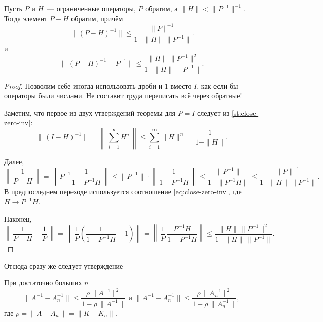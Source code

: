 \documentclass{trlnotes}
\begin{document}
    \begin{st} \label{st:close-inv}
        Пусть $P$ и $H$~--- ограниченные операторы, $P$ обратим, а $\|H\| < \|P^{-1}\|^{-1}$. Тогда элемент $P - H$ обратим, причём
        \[
            \big\| \, (P - H)^{-1}\big\|  \leqslant \dfrac{\|P\|^{-1}}{1 - \|H\| \, \|P^{-1}\|}. 
        \]
        и
        \[
            \big\| \, (P - H)^{-1} - P^{-1}\big\| \leqslant \dfrac{\|H\| \, \|P^{-1}\|^2}{1 - \|H\| \, \|P^{-1}\|}.
        \]
        \begin{proof}
            Позволим себе иногда использовать дроби и $1$ вместо $I$, как если бы операторы были числами. Не составит труда переписать всё через обратные!

            Заметим, что первое из двух утверждений теоремы для $P = I$ следует из \ref{st:close-zero-inv}:
            \begin{equation}\label{eq:close-zero-inv}
                \big\| \, (I - H)^{-1}\big\| = \left \| \, \sum\limits_{i = 1}^{\infty} H^n \, \right\| \leqslant \sum\limits_{i = 1}^{\infty} \|H\|^n = \dfrac{1}{1 - \|H\|}.
            \end{equation}

            Далее,
            \[
                \left\|\, \dfrac{1}{P - H} \,\right \| = \left\|\, P^{-1} \dfrac{1}{1 - P^{-1}H} \,\right \| \leqslant \|P^{-1}\| \cdot \left\|\,\dfrac{1}{1 - P^{-1}H} \,\right \| \leqslant \dfrac{\|P^{-1}\|}{1 - \|P^{-1}H\|} \leqslant \dfrac{\|P\|^{-1}}{1 - \|H\| \, \|P^{-1}\|}.
            \]
            В предпоследнем переходе используется соотношение \ref{eq:close-zero-inv}, где $H \to P^{-1}H$.

            Наконец,
            \[
                \left\|\, \dfrac{1}{P - H} - \dfrac{1}{P}\,\right \| = \left\|\, \dfrac{1}{P}\left(\dfrac{1}{1 - P^{-1}H} - 1 \right)\right \| =  \left\|\, \dfrac{1}{P} \, \dfrac{P^{-1}H}{1 - P^{-1}H} \right \| \leqslant \dfrac{\|H\| \, \|P^{-1}\|^2}{1 - \|H\| \, \|P^{-1}\|}.
            \]
        \end{proof}
    \end{st}

    Отсюда сразу же следует утверждение

    \begin{st}\label{st:dif-inv}
        При достаточно больших $n$
        \[
            \big\|A^{-1} - A_n^{-1}\big\| \leqslant \dfrac{\rho \, \|A^{-1}\|^2}{1 - \rho \, \|A^{-1}\|} \text{ и } \big\|A^{-1} - A_n^{-1}\big\| \leqslant \dfrac{\rho \, \|A_n^{-1}\|^2}{1 - \rho \, \|A_n^{-1}\|},
        \]
        где $\rho = \|A - A_n\| = \|K - K_n\|$.
    \end{st}
\end{document}
